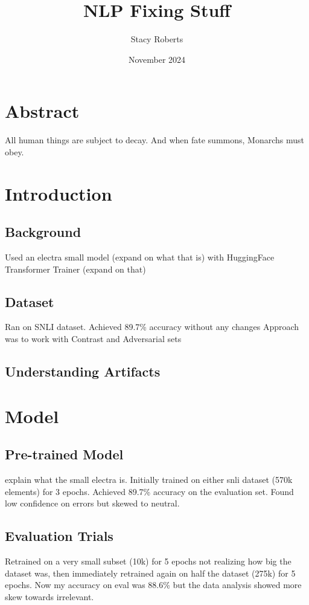 \documentclass{article}
\title{NLP Fixing Stuff}
\author{Stacy Roberts}
\date{November 2024}
\begin{document}
\maketitle

\begin{multicols*}{2}

\section*{Abstract}
All human things are subject to decay. And when fate summons, Monarchs must obey.

\section{Introduction}
\subsection{Background}

Used an electra small model (expand on what that is) with HuggingFace Transformer Trainer (expand on that)

\subsection{Dataset}
Ran on SNLI dataset. Achieved 89.7\% accuracy without any changes
Approach was to work with Contrast and Adversarial sets
\subsection{Understanding Artifacts}
\section{Model}
\subsection{Pre-trained Model}
explain what the small electra is.
Initially trained on either snli dataset (570k elements) for 3 epochs. Achieved 89.7\% accuracy on the evaluation set. Found low confidence on errors but skewed to neutral.
\subsection{Evaluation Trials}
Retrained on a very small subset (10k) for 5 epochs not realizing how big the dataset was, then immediately retrained again on half the dataset (275k) for 5 epochs. Now my accuracy on eval was 88.6\% but the data analysis showed more skew towards irrelevant.


\end{multicols*}
\end{document}
